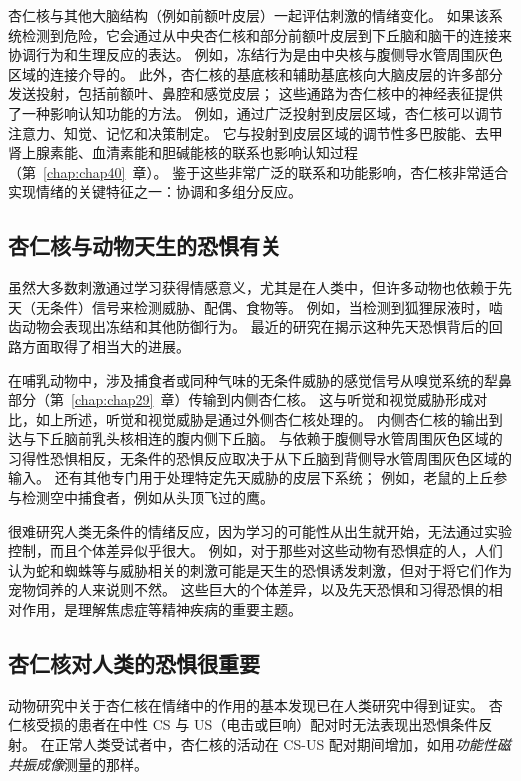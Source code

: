 杏仁核与其他大脑结构（例如前额叶皮层）一起评估刺激的情绪变化。
如果该系统检测到危险，它会通过从中央杏仁核和部分前额叶皮层到下丘脑和脑干的连接来协调行为和生理反应的表达。
例如，冻结行为是由中央核与腹侧导水管周围灰色区域的连接介导的。
此外，杏仁核的基底核和辅助基底核向大脑皮层的许多部分发送投射，包括前额叶、鼻腔和感觉皮层；
这些通路为杏仁核中的神经表征提供了一种影响认知功能的方法。
例如，通过广泛投射到皮层区域，杏仁核可以调节注意力、知觉、记忆和决策制定。
它与投射到皮层区域的调节性多巴胺能、去甲肾上腺素能、血清素能和胆碱能核的联系也影响认知过程（第~\ref{chap:chap40}~章）。
鉴于这些非常广泛的联系和功能影响，杏仁核非常适合实现情绪的关键特征之一：协调和多组分反应。



\subsection{杏仁核与动物天生的恐惧有关}

虽然大多数刺激通过学习获得情感意义，尤其是在人类中，但许多动物也依赖于先天（无条件）信号来检测威胁、配偶、食物等。
例如，当检测到狐狸尿液时，啮齿动物会表现出冻结和其他防御行为。
最近的研究在揭示这种先天恐惧背后的回路方面取得了相当大的进展。


在哺乳动物中，涉及捕食者或同种气味的无条件威胁的感觉信号从嗅觉系统的犁鼻部分（第~\ref{chap:chap29}~章）传输到内侧杏仁核。
这与听觉和视觉威胁形成对比，如上所述，听觉和视觉威胁是通过外侧杏仁核处理的。
内侧杏仁核的输出到达与下丘脑前乳头核相连的腹内侧下丘脑。
与依赖于腹侧导水管周围灰色区域的习得性恐惧相反，无条件的恐惧反应取决于从下丘脑到背侧导水管周围灰色区域的输入。
还有其他专门用于处理特定先天威胁的皮层下系统；
例如，老鼠的上丘参与检测空中捕食者，例如从头顶飞过的鹰。


很难研究人类无条件的情绪反应，因为学习的可能性从出生就开始，无法通过实验控制，而且个体差异似乎很大。
例如，对于那些对这些动物有恐惧症的人，人们认为蛇和蜘蛛等与威胁相关的刺激可能是天生的恐惧诱发刺激，但对于将它们作为宠物饲养的人来说则不然。
这些巨大的个体差异，以及先天恐惧和习得恐惧的相对作用，是理解焦虑症等精神疾病的重要主题。



\subsection{杏仁核对人类的恐惧很重要}

动物研究中关于杏仁核在情绪中的作用的基本发现已在人类研究中得到证实。
杏仁核受损的患者在中性 CS 与 US（电击或巨响）配对时无法表现出恐惧条件反射。
在正常人类受试者中，杏仁核的活动在 CS-US 配对期间增加，如用\textit{功能性磁共振成像}测量的那样。


